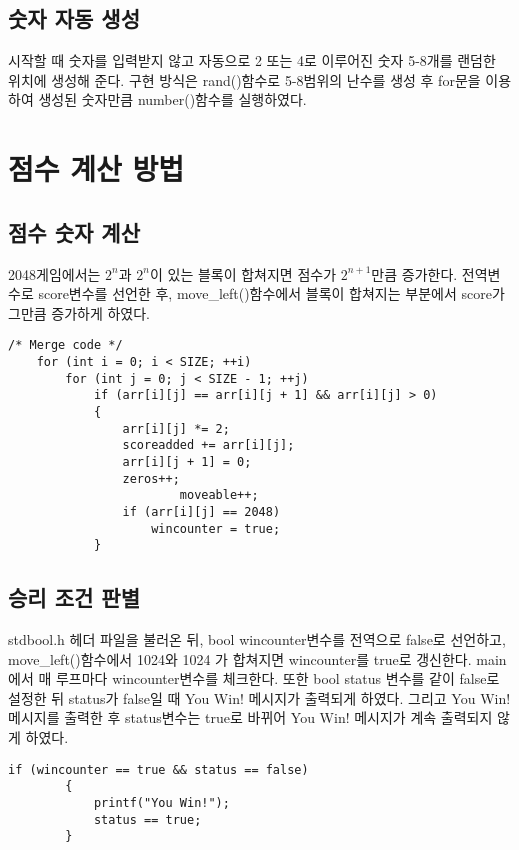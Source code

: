 \documentclass[a4paper]{article}
\begin{document}
    \subsection{숫자 자동 생성}
        시작할 때 숫자를 입력받지 않고 자동으로 2 또는 4로 이루어진 숫자 5-8개를 랜덤한 위치에 생성해 준다.
        구현 방식은 rand()함수로 5-8범위의 난수를 생성 후 for문을 이용하여 생성된 숫자만큼 
        number()함수를 실행하였다.
     
    \section{점수 계산 방법}
    \subsection{점수 숫자 계산}
        2048게임에서는 \(\displaystyle 2^n\)과 \(\displaystyle 2^n\)이 있는 블록이 합쳐지면
        점수가 \(\displaystyle 2^{n+1}\)만큼 증가한다. 
        전역변수로 score변수를 선언한 후, move\_left()함수에서
        블록이 합쳐지는 부분에서 score가 그만큼 증가하게 하였다.

        \begin{lstlisting}[style=CStyle]
    /* Merge code */
    for (int i = 0; i < SIZE; ++i)
        for (int j = 0; j < SIZE - 1; ++j)
            if (arr[i][j] == arr[i][j + 1] && arr[i][j] > 0)
            {
                arr[i][j] *= 2;
                scoreadded += arr[i][j];
                arr[i][j + 1] = 0;
                zeros++;
				        moveable++;
                if (arr[i][j] == 2048)
                    wincounter = true;
            }
        \end{lstlisting}
        \subsection{승리 조건 판별}
        stdbool.h 헤더 파일을 불러온 뒤, bool wincounter변수를 전역으로 false로 선언하고, move\_left()함수에서 1024와 1024
        가 합쳐지면 wincounter를 true로 갱신한다. main에서 매 루프마다 wincounter변수를 체크한다. 또한 bool status 변수를 같이 false로 설정한 뒤
        status가 false일 때 You Win! 메시지가 출력되게 하였다. 그리고 You Win! 메시지를 출력한 후 status변수는 true로 바뀌어 You Win! 메시지가
        계속 출력되지 않게 하였다.
        \begin{lstlisting}[style=CStyle]
        if (wincounter == true && status == false)
        {
            printf("You Win!");
            status == true;
        }
        \end{lstlisting}
\end{document}

